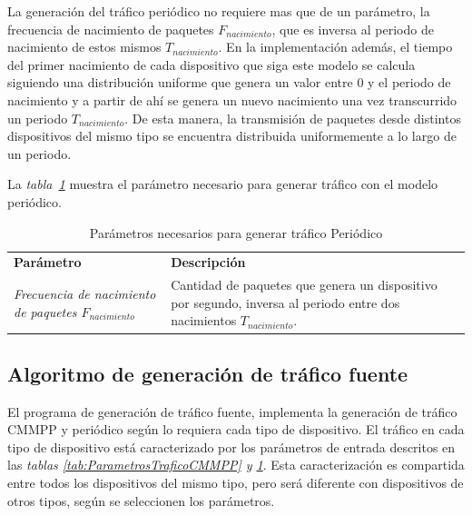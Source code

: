 La generación del tráfico periódico no requiere mas que de un parámetro, la frecuencia de nacimiento de paquetes $F_{nacimiento}$, que es inversa al periodo de nacimiento de estos mismos $T_{nacimiento}$. En la implementación además, el tiempo del primer nacimiento de cada dispositivo que siga este modelo se calcula siguiendo una distribución uniforme que genera un valor entre 0 y el periodo de nacimiento y a partir de ahí se genera un nuevo nacimiento una vez transcurrido un periodo $T_{nacimiento}$. De esta manera, la transmisión de paquetes desde distintos dispositivos del mismo tipo se encuentra distribuida uniformemente a lo largo de un periodo.\newline

La \textit{tabla~\ref{tab:ParametrosTraficoPeriodico}} muestra el parámetro necesario para generar tráfico con el modelo periódico.\newline

\begin{table}
    \caption{Parámetros necesarios para generar tráfico Periódico}
    \label{tab:ParametrosTraficoPeriodico}
    \centering
    \begin{tabular}{|m{6cm}|p{10cm}|} \\ 
    \textbf{Parámetro} & \textbf{Descripción} \\ 
    \textit{Frecuencia de nacimiento de paquetes $F_{nacimiento}$}  & \footnotesize{ Cantidad de paquetes que genera un dispositivo por segundo, inversa al periodo entre dos nacimientos $T_{nacimiento}$. } \\ \hline 
 
    \end{tabular}
\end{table}

\subsection{Algoritmo de generación de tráfico fuente}

El programa de generación de tráfico fuente, implementa la generación de tráfico CMMPP y periódico según lo requiera cada tipo de dispositivo. El tráfico en cada tipo de dispositivo está caracterizado por los parámetros de entrada descritos en las \textit{tablas \ref{tab:ParametrosTraficoCMMPP} y \ref{tab:ParametrosTraficoPeriodico}}. Esta caracterización es compartida entre todos los dispositivos del mismo tipo, pero será diferente con dispositivos de otros tipos, según se seleccionen los parámetros.\newline

